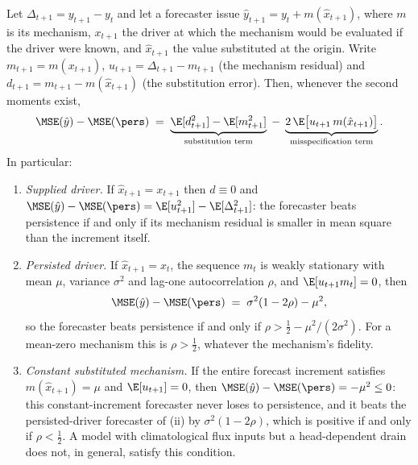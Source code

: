 \begin{proposition}\label{prop:increment}
Let $\Delta_{t+1}=y_{t+1}-y_t$ and let a forecaster issue $\hat y_{t+1}=y_t+m(\hat x_{t+1})$, where $m$ is its mechanism, $x_{t+1}$ the driver at which the mechanism would be evaluated if the driver were known, and $\hat x_{t+1}$ the value substituted at the origin. Write $m_{t+1}=m(x_{t+1})$, $u_{t+1}=\Delta_{t+1}-m_{t+1}$ (the mechanism residual) and $d_{t+1}=m_{t+1}-m(\hat x_{t+1})$ (the substitution error). Then, whenever the second moments exist,
\begin{equation}\label{eq:decomp}
\MSE(\hat y)-\MSE(\pers)\;=\;\underbrace{\E[d_{t+1}^2]-\E[m_{t+1}^2]}_{\text{substitution term}}\;-\;\underbrace{2\,\E\bigl[u_{t+1}\,m(\hat x_{t+1})\bigr]}_{\text{misspecification term}} .
\end{equation}
In particular:
\begin{enumerate}[label=(\roman*),leftmargin=2.2em,itemsep=2pt]
\item \emph{Supplied driver.} If $\hat x_{t+1}=x_{t+1}$ then $d\equiv0$ and $\MSE(\hat y)-\MSE(\pers)=\E[u_{t+1}^2]-\E[\Delta_{t+1}^2]$: the forecaster beats persistence if and only if its mechanism residual is smaller in mean square than the increment itself.
\item \emph{Persisted driver.} If $\hat x_{t+1}=x_t$, the sequence $m_t$ is weakly stationary with mean $\mu$, variance $\sigma^2$ and lag-one autocorrelation $\rho$, and $\E[u_{t+1}m_t]=0$, then
\[\MSE(\hat y)-\MSE(\pers)\;=\;\sigma^2(1-2\rho)-\mu^2,\]
so the forecaster beats persistence if and only if $\rho>\tfrac12-\mu^2/(2\sigma^2)$. For a mean-zero mechanism this is $\rho>\tfrac12$, whatever the mechanism's fidelity.
\item \emph{Constant substituted mechanism.} If the entire forecast increment satisfies $m(\hat x_{t+1})=\mu$ and $\E[u_{t+1}]=0$, then $\MSE(\hat y)-\MSE(\pers)=-\mu^2\le0$: this constant-increment forecaster never loses to persistence, and it beats the persisted-driver forecaster of (ii) by $\sigma^2(1-2\rho)$, which is positive if and only if $\rho<\tfrac12$. A model with climatological flux inputs but a head-dependent drain does not, in general, satisfy this condition.
\end{enumerate}
\end{proposition}

